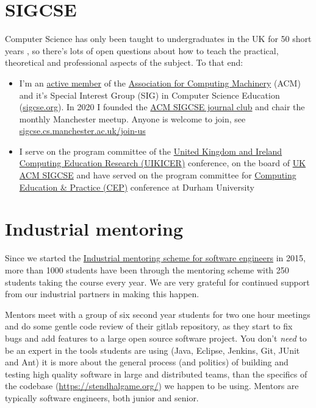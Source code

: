 \documentclass[
  12pt,
]{book}
\providecommand{\tightlist}{%
  \setlength{\itemsep}{0pt}\setlength{\parskip}{0pt}}
\begin{document}
\hypertarget{sigcse}{%
\section{SIGCSE}\label{sigcse}}

Computer Science has only been taught to undergraduates in the UK for 50 short years \citep{babygrowsup, sigcse50}, so there's lots of open questions about how to teach the practical, theoretical and professional aspects of the subject. To that end:

\begin{itemize}
\tightlist
\item
  I'm an \href{https://dl.acm.org/profile/81350580198}{active member} of the \href{https://en.wikipedia.org/wiki/Association_for_Computing_Machinery}{Association for Computing Machinery} (ACM) and it's Special Interest Group (SIG) in Computer Science Education (\href{https://sigcse.org}{sigcse.org}). In 2020 I founded the \href{https://sigcse.cs.manchester.ac.uk/}{ACM SIGCSE journal club} and chair the monthly Manchester meetup. Anyone is welcome to join, see \href{https://sigcse.cs.manchester.ac.uk/join-us}{sigcse.cs.manchester.ac.uk/join-us}
\item
  I serve on the program committee of the \href{https://www.ukicer.com/}{United Kingdom and Ireland Computing Education Research (UIKICER)} conference, on the board of \href{https://uki-sigcse.acm.org/about}{UK ACM SIGCSE} and have served on the program committee for \href{http://community.dur.ac.uk/cep.conference}{Computing Education \& Practice (CEP)} conference at Durham University
\end{itemize}

\hypertarget{industrial-mentoring}{%
\section{Industrial mentoring}\label{industrial-mentoring}}

Since we started the \href{https://www.cs.manchester.ac.uk/connect/business-engagement/industrial-mentoring/}{Industrial mentoring scheme for software engineers} in 2015, more than 1000 students have been through the mentoring scheme with 250 students taking the course every year. We are very grateful for continued support from our industrial partners in making this happen.

Mentors meet with a group of six second year students for two one hour meetings and do some gentle code review of their gitlab repository, as they start to fix bugs and add features to a large open source software project. You don't \emph{need} to be an expert in the tools students are using (Java, Eclipse, Jenkins, Git, JUnit and Ant) it is more about the general process (and politics) of building and testing high quality software in large and distributed teams, than the specifics of the codebase (\url{https://stendhalgame.org/}) we happen to be using. Mentors are typically software engineers, both junior and senior.
\end{document}
